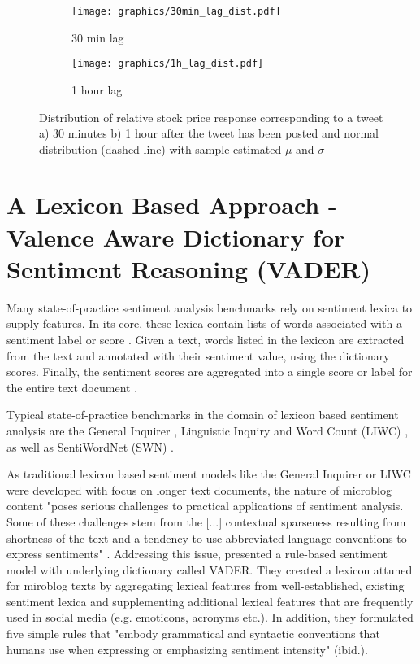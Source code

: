 \documentclass[a4paper,12pt]{article}%
\begin{document}
\begin{figure}
\captionsetup{justification=centering}
 \begin{subfigure}[b]{0.5\textwidth}
        \centering
        \texttt{[image: graphics/30min\_lag\_dist.pdf]}
        \caption{30 min lag}
   \end{subfigure}
 \begin{subfigure}[b]{0.5\textwidth}
        \centering
        \texttt{[image: graphics/1h\_lag\_dist.pdf]}
        \caption{1 hour lag}
   \end{subfigure}
\caption[Empirical Distribution of Short-Term Stock Returns]{Distribution of relative stock price response corresponding to a tweet a) 30 minutes b) 1 hour after the tweet has been posted and normal distribution (dashed line) with sample-estimated $\mu$ and $\sigma$  \label{fig:lags_hist}}
\end{figure}


\section{A Lexicon Based Approach - Valence Aware Dictionary for Sentiment Reasoning (VADER) \label{lexion-approach}}
Many state-of-practice sentiment analysis benchmarks rely on sentiment lexica to supply features. In its core, these lexica contain lists of words associated with a sentiment label or score . Given a text, words listed in the lexicon are extracted from the text and annotated with their sentiment value, using the dictionary scores. Finally, the sentiment scores are aggregated into a single score or label for the entire text document \citep{Taboada2011}.

Typical state-of-practice benchmarks in the domain of lexicon based sentiment analysis are the General Inquirer \citep{Stone1966}, Linguistic Inquiry and Word Count (LIWC) \citep{Pennebaker2001, Pennebaker2007}, as well as SentiWordNet (SWN) \citep{Baccianella2010}.

As traditional lexicon based sentiment models like the General Inquirer or LIWC were developed with focus on longer text documents, the nature of microblog content "poses serious challenges to practical applications of sentiment analysis. Some of these challenges stem from the [...] contextual sparseness resulting from shortness of the text and a tendency to use abbreviated language conventions to express sentiments" \citep{Hutto2014}.
Addressing this issue, \citeauthor{Hutto2014} presented a rule-based sentiment model with underlying dictionary called VADER. They created a lexicon attuned for miroblog texts by aggregating lexical features from well-established, existing sentiment lexica and supplementing additional lexical features that are frequently used in social media (e.g. emoticons, acronyms etc.). In addition, they formulated five simple rules that "embody grammatical and syntactic conventions that humans use when expressing or emphasizing sentiment intensity" (ibid.).
\end{document}
